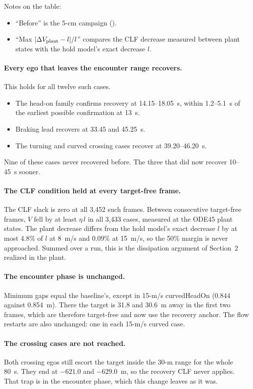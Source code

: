 \documentclass[11pt]{article}
\begin{document}
Notes on the table:
\begin{itemize}
\item ``Before'' is the 5-cm campaign ().
\item ``Max $|\Delta V_{\rm plant}-l|/l$'' compares the CLF decrease measured
between plant states with the hold model's exact decrease $l$.
\end{itemize}

\paragraph{Every ego that leaves the encounter range recovers.} This holds for
all twelve such cases.
\begin{itemize}
\item The head-on family confirms recovery at 14.15--18.05~s, within 1.2--5.1~s
of the earliest possible confirmation at 13~s.
\item Braking lead recovers at 33.45 and 45.25~s.
\item The turning and curved crossing cases recover at 39.20--46.20~s.
\end{itemize}
Nine of these cases never recovered before. The three that did now recover
10--45~s sooner.

\paragraph{The CLF condition held at every target-free frame.} The CLF slack
is zero at all 3{,}452 such frames. Between consecutive target-free frames,
$V$ fell by at least $\eta\,l$ in all 3{,}433 cases, measured at the ODE45 plant
states. The plant decrease differs from the hold model's exact decrease $l$ by at most
4.8\% of $l$ at 8~m/s and 0.09\% at 15~m/s, so the 50\% margin is never
approached. Summed over a run, this is the dissipation argument of Section~2
realized in the plant.

\paragraph{The encounter phase is unchanged.} Minimum gaps equal the
baseline's, except in 15-m/s curvedHeadOn (0.844 against 0.854~m). There the
target is 31.8 and 30.6~m away in the first two frames, which are therefore
target-free and now use the recovery anchor. The flow restarts are also
unchanged: one in each 15-m/s curved case.

\paragraph{The crossing cases are not reached.} Both crossing egos still escort
the target inside the 30-m range for the whole 80~s. They end at $-621.0$ and
$-629.0$~m, so the recovery CLF never applies. That trap is in the encounter
phase, which this change leaves as it was.
\end{document}
